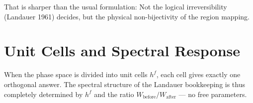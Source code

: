 That is sharper than the usual formulation: Not the logical
irreversibility (Landauer 1961) decides, but the physical
non-bijectivity of the region mapping. 

\section{Unit Cells and Spectral Response}

When the phase space is divided into unit cells $h^f$, each
cell gives exactly one orthogonal answer. The spectral structure of the
Landauer bookkeeping is thus completely determined by $h^f$ and the ratio
$W_{\text{before}}/W_{\text{after}}$ --- no free parameters.

